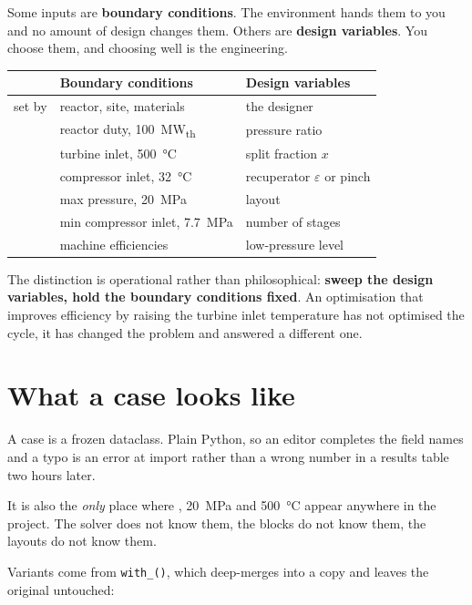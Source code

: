\documentclass[11pt,a4paper]{report}
\newcommand{\code}[1]{\texttt{\small #1}}
\begin{document}
Some inputs are \textbf{boundary conditions}. The environment hands them to
you and no amount of design changes them. Others are \textbf{design
variables}. You choose them, and choosing well is the engineering.

\begin{center}
\begin{tabular}{@{}lll@{}}
\toprule
& \textbf{Boundary conditions} & \textbf{Design variables} \\
\midrule
set by & reactor, site, materials & the designer \\
\midrule
 & reactor duty, \SI{100}{\mega\watt_{th}}   & pressure ratio \\
 & turbine inlet, \SI{500}{\celsius}         & split fraction $x$ \\
 & compressor inlet, \SI{32}{\celsius}       & recuperator $\varepsilon$ or pinch \\
 & max pressure, \SI{20}{\mega\pascal}       & layout \\
 & min compressor inlet, \SI{7.7}{\mega\pascal} & number of stages \\
 & machine efficiencies                      & low-pressure level \\
\bottomrule
\end{tabular}
\end{center}

The distinction is operational rather than philosophical: \textbf{sweep the
design variables, hold the boundary conditions fixed}. An optimisation that
improves efficiency by raising the turbine inlet temperature has not
optimised the cycle, it has changed the problem and answered a different
one.

\section{What a case looks like}


\noindent A case is a frozen dataclass. Plain Python, so an editor completes
the field names and a typo is an error at import rather than a wrong number
in a results table two hours later.

It is also the \emph{only} place where , \SI{20}{\mega\pascal} and
\SI{500}{\celsius} appear anywhere in the project. The solver does not know
them, the blocks do not know them, the layouts do not know them.

Variants come from \code{with\_()}, which deep-merges into a copy and leaves
the original untouched:
\end{document}
